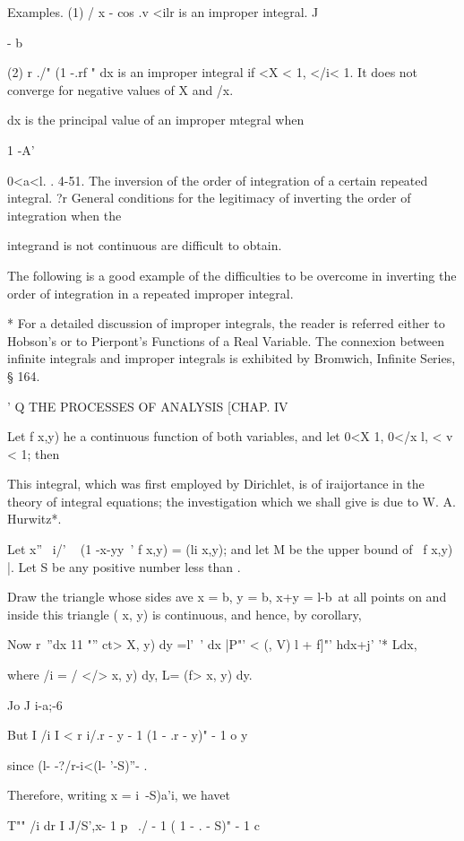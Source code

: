 Examples. (1) / x - cos .v <ilr is an improper integral. J

- b

(2) r ./" (1 -.rf " dx is an improper integral if <X < 1, </i< 1. It
does not converge for negative values of X and /x.

dx is the principal value of an improper mtegral when

1 -A'

0<a<l. . 4-51. The inversion of the order of integration of a certain
repeated integral. ?r General conditions for the legitimacy of
inverting the order of integration when the

integrand is not continuous are difficult to obtain.

The following is a good example of the difficulties to be overcome in
inverting the order of integration in a repeated improper integral.

* For a detailed discussion of improper integrals, the reader is
referred either to Hobson's or to Pierpont's Functions of a Real
Variable. The connexion between infinite integrals and improper
integrals is exhibited by Bromwich, Infinite Series, § 164.

' Q THE PROCESSES OF ANALYSIS [CHAP. IV

Let f x,y) he a continuous function of both variables, and let 0<X 1,
0</x l, < v < 1; then

This integral, which was first employed by Dirichlet, is of
iraijortance in the theory of integral equations; the investigation
which we shall give is due to W. A. Hurwitz*.

Let x''~ i/' ~ (1 -x-yy~' f x,y) = (li x,y); and let M be the upper
bound of \ f x,y) |. Let S be any positive number less than .

Draw the triangle whose sides ave x = b, y = b, x+y = l-b\ at all
points on and inside this triangle ( x, y) is continuous, and hence,
by corollary,

Now r~''dx 11 "'' ct> X, y) dy =l'~' dx |P"' < (, V) l + f]"' hdx+j'
'* Ldx,

where /i = / </> x, y) dy, L= (f> x, y) dy.

Jo J i-a;-6

But I /i I < r i/.r - y - 1 (1 - .r - y)" - 1 o y

since (l- -?/r-i<(l- '-S)''- .

Therefore, writing x = i\ -S)a'i, we havet

T"" /i dr I J/S',x- 1 p~ ./ - 1 ( 1 - .  - S)" - 1 c

